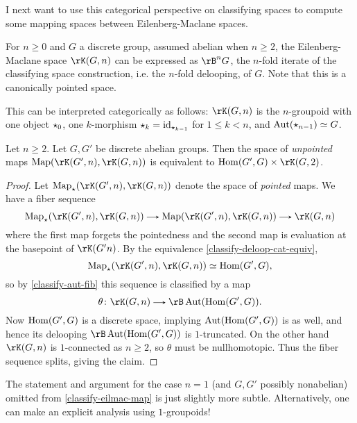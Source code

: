 \begin{nothing}
  \label{classify-eilmac}
  I next want to use this categorical perspective on classifying spaces to compute some mapping spaces between Eilenberg-Maclane spaces.

  \begin{subremark}
    \label{classify-eilmac-deloop}
    For $n \ge 0$ and $G$ a discrete group, assumed abelian when $n \ge 2$, the Eilenberg-Maclane space $\rK(G,n)$ can be expressed as $\rB^nG$, the $n$-fold iterate of the classifying space construction, i.e. the $n$-fold delooping, of $G$. Note that this is a canonically pointed space.

    This can be interpreted categorically as follows: $\rK(G,n)$ is the $n$-groupoid with one object $\star_0$, one $k$-morphism $\star_k = \mathrm{id}_{\star_{k-1}}$ for $1 \le k < n$, and $\operatorname{Aut}(\star_{n-1}) \simeq G$.
  \end{subremark}

  \begin{subproposition}
    \label{classify-eilmac-map}
    Let $n \ge 2$. Let $G,G'$ be discrete abelian groups. Then the space of \emph{unpointed} maps $\Map(\rK(G',n),\rK(G,n))$ is equivalent to $\Hom(G',G) \times \rK(G,2)$.

    \begin{proof}
      Let $\Map_\pt(\rK(G',n),\rK(G,n))$ denote the space of \emph{pointed} maps. We have a fiber sequence
      \[
        \Map_\pt(\rK(G',n),\rK(G,n)) \to \Map(\rK(G',n),\rK(G,n)) \to \rK(G,n)
      \]
      where the first map forgets the pointedness and the second map is evaluation at the basepoint of $\rK(G'n)$. By the equivalence \cref{classify-deloop-cat-equiv},
      \[
        \Map_\pt(\rK(G',n),\rK(G,n)) \iso \Hom(G',G),
      \]
      so by \cref{classify-aut-fib} this sequence is classified by a map
      \[
        \theta \c \rK(G,n) \to \rB\Aut(\Hom(G',G)).
      \]
      Now $\operatorname{Hom}(G',G)$ is a discrete space, implying $\operatorname{Aut}(\operatorname{Hom}(G',G))$ is as well, and hence its delooping $\rB\Aut(\Hom(G',G))$ is $1$-truncated. On the other hand $\rK(G,n)$ is $1$-connected as $n \ge 2$, so $\theta$ must be nullhomotopic. Thus the fiber sequence splits, giving the claim.
    \end{proof}
  \end{subproposition}

  \begin{subremark}
    \label{classify-eilmac-omit}
    The statement and argument for the case $n=1$ (and $G,G'$ possibly nonabelian) omitted from \cref{classify-eilmac-map} is just slightly more subtle. Alternatively, one can make an explicit analysis using $1$-groupoids!
  \end{subremark}
\end{nothing}

